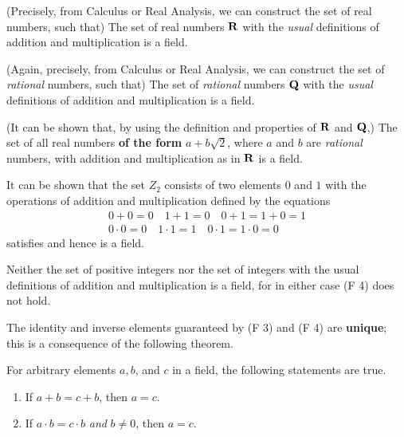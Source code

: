 \begin{example} \label{example c.1}
(Precisely, from Calculus or Real Analysis, we can construct the set of real numbers, such that) The set of real numbers \(\mathbf{R}\) with the \emph{usual} definitions of addition and multiplication is a field.
\end{example}

\begin{example} \label{example c.2}
(Again, precisely, from Calculus or Real Analysis, we can construct the set of \emph{rational} numbers, such that) The set of \emph{rational} numbers \(\mathbf{Q}\) with the \emph{usual} definitions of addition and multiplication is a field.
\end{example}

\begin{example} \label{example c.3}
(It can be shown that, by using the definition and properties of \(\mathbf{R}\) and \(\mathbf{Q}\),)
The set of all real numbers \textbf{of the form} \(a + b \sqrt{2}\), where \(a\) and \(b\) are \emph{rational} numbers, with addition and multiplication as in \(\mathbf{R}\) is a field.
\end{example}

\begin{example} \label{example c.4} It can be shown that the set \(Z_2\) consists of two elements \(0\) and \(1\) with the operations of addition
and multiplication defined by the equations
\[
    \begin{array}{r}
        0+0=0 \quad 1+1=0 \quad 0+1=1+0=1 \\
        0 \cdot 0=0 \quad 1 \cdot 1=1 \quad 0 \cdot 1=1 \cdot 0=0
    \end{array}
\]
satisfies  and hence is a field.
\end{example}

\begin{example} \label{example c.5}
Neither the set of positive integers nor the set of integers with the usual definitions of addition and multiplication is a field, for in either case (F 4) does not hold.
\end{example}

The identity and inverse elements guaranteed by (F 3) and (F 4) are \textbf{unique}; this is a consequence of the following theorem.

\begin{appendix theorem}  \label{thm c.1}
For arbitrary elements \(a, b\), and \(c\) in a field, the following statements are true.
\begin{enumerate}
\item If \(a + b = c + b\), then \(a = c\).
\item If \(a \cdot b = c \cdot b\) \emph{and} \(b \ne 0\), then \(a = c\).
\end{enumerate}
\end{appendix theorem}

